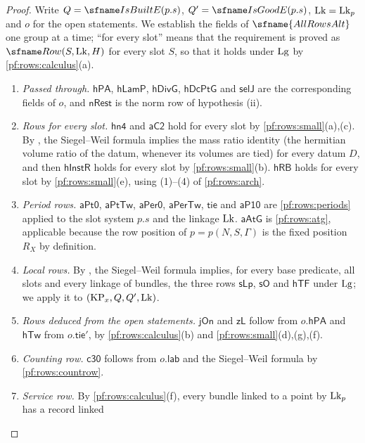 \begin{proof}
Write $Q=\rowsBuilt(p.s)$, $Q'=\rowsGood(p.s)$, $\mathrm{Lk}=\mathrm{Lk}_p$ and $o$ for the open statements. We establish the
fields of $\sfname{AllRowsAlt}$ one group at a time; ``for every slot'' means that the requirement is proved as
$\rowsRow(S,\rowsLk,H)$ for every slot $S$, so that it holds under $\mathrm{Lg}$ by \cref{pf:rows:calculus}(a).
\begin{enumerate}[label=\arabic*.]
\item \emph{Passed through.} $\mathsf{hPA}$, $\mathsf{hLamP}$, $\mathsf{hDivG}$, $\mathsf{hDcPtG}$ and $\mathsf{selJ}$ are the
corresponding fields of $o$, and $\mathsf{nRest}$ is the norm row of hypothesis (ii).
\item \emph{Rows for every slot.} $\mathsf{hn4}$ and $\mathsf{aC2}$ hold for every slot by \cref{pf:rows:small}(a),(c).
By , the Siegel--Weil formula implies the mass ratio
identity (the hermitian volume ratio of the datum, whenever its volumes are tied) for every datum $D$, and then
$\mathsf{hInstR}$ holds for every slot by \cref{pf:rows:small}(b). $\mathsf{hRB}$ holds for every slot by
\cref{pf:rows:small}(e), using (1)--(4) of \cref{pf:rows:arch}.
\item \emph{Period rows.} $\mathsf{aPt0}$, $\mathsf{aPtTw}$, $\mathsf{aPer0}$, $\mathsf{aPerTw}$, $\mathsf{tie}$ and $\mathsf{aP10}$ are
\cref{pf:rows:periods} applied to the slot system $p.s$ and the linkage $\mathrm{Lk}$. $\mathsf{aAtG}$ is \cref{pf:rows:atg},
applicable because the row position of $p=p(N,S,\Gamma)$ is the fixed position $R_X$ by definition.
\item \emph{Local rows.} By , the Siegel--Weil formula implies, for
every base predicate, all slots and every linkage of bundles, the three rows $\mathsf{sLp}$, $\mathsf{sO}$ and $\mathsf{hTF}$
under $\mathrm{Lg}$; we apply it to $(\mathrm{KP}_x,Q,Q',\mathrm{Lk})$.
\item \emph{Rows deduced from the open statements.} $\mathsf{jOn}$ and $\mathsf{zL}$ follow from $o.\mathsf{hPA}$ and
$\mathsf{hTw}$ from $o.\mathsf{tie}'$, by \cref{pf:rows:calculus}(b) and \cref{pf:rows:small}(d),(g),(f).
\item \emph{Counting row.} $\mathsf{c30}$ follows from $o.\mathsf{lab}$ and the Siegel--Weil formula by \cref{pf:rows:countrow}.
\item \emph{Service row.} By \cref{pf:rows:calculus}(f), every bundle linked to a point by $\mathrm{Lk}_p$ has a record linked

\end{enumerate}
\end{proof}
